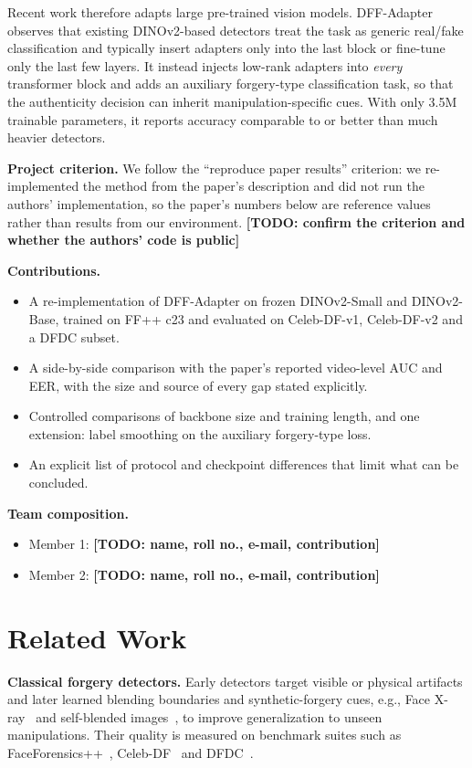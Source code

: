 \documentclass[lettersize,journal]{IEEEtran}
\newcommand{\todo}[1]{\textbf{[TODO: #1]}}
\begin{document}
Recent work therefore adapts large pre-trained vision models. DFF-Adapter~\cite{zhang2026dff} observes that existing DINOv2-based detectors treat the task as generic real/fake classification and typically insert adapters only into the last block or fine-tune only the last few layers. It instead injects low-rank adapters into \emph{every} transformer block and adds an auxiliary forgery-type classification task, so that the authenticity decision can inherit manipulation-specific cues. With only 3.5M trainable parameters, it reports accuracy comparable to or better than much heavier detectors.

\textbf{Project criterion.} We follow the ``reproduce paper results'' criterion: we re-implemented the method from the paper's description and did not run the authors' implementation, so the paper's numbers below are reference values rather than results from our environment. \todo{confirm the criterion and whether the authors' code is public}

\textbf{Contributions.}
\begin{itemize}
\item A re-implementation of DFF-Adapter on frozen DINOv2-Small and DINOv2-Base, trained on FF++ c23 and evaluated on Celeb-DF-v1, Celeb-DF-v2 and a DFDC subset.
\item A side-by-side comparison with the paper's reported video-level AUC and EER, with the size and source of every gap stated explicitly.
\item Controlled comparisons of backbone size and training length, and one extension: label smoothing on the auxiliary forgery-type loss.
\item An explicit list of protocol and checkpoint differences that limit what can be concluded.
\end{itemize}

\textbf{Team composition.}
\begin{itemize}
\item Member 1: \todo{name, roll no., e-mail, contribution}
\item Member 2: \todo{name, roll no., e-mail, contribution}
\end{itemize}

\section{Related Work}
\textbf{Classical forgery detectors.} Early detectors target visible or physical artifacts and later learned blending boundaries and synthetic-forgery cues, e.g., Face X-ray~\cite{li2020facexray} and self-blended images~\cite{shiohara2022sbi}, to improve generalization to unseen manipulations. Their quality is measured on benchmark suites such as FaceForensics++~\cite{rossler2019faceforensics}, Celeb-DF~\cite{li2020celebdf} and DFDC~\cite{dolhansky2020dfdc}.
\end{document}
